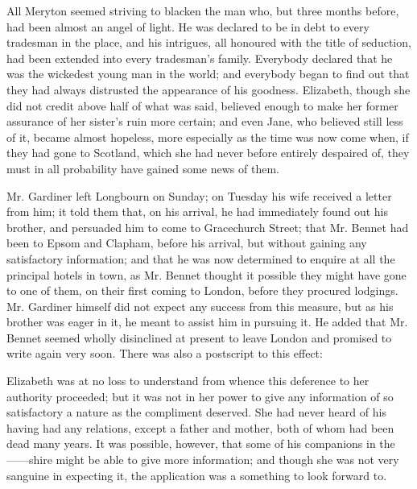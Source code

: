 All Meryton seemed striving to blacken the man who, but three months before, had been almost an angel of light. He was declared to be in debt to every tradesman in the place, and his intrigues, all honoured with the title of seduction, had been extended into every tradesman's family. Everybody declared that he was the wickedest young man in the world; and everybody began to find out that they had always distrusted the appearance of his goodness. Elizabeth, though she did not credit above half of what was said, believed enough to make her former assurance of her sister's ruin more certain; and even Jane, who believed still less of it, became almost hopeless, more especially as the time was now come when, if they had gone to Scotland, which she had never before entirely despaired of, they must in all probability have gained some news of them.

Mr. Gardiner left Longbourn on Sunday; on Tuesday his wife received a letter from him; it told them that, on his arrival, he had immediately found out his brother, and persuaded him to come to Gracechurch Street; that Mr. Bennet had been to Epsom and Clapham, before his arrival, but without gaining any satisfactory information; and that he was now determined to enquire at all the principal hotels in town, as Mr. Bennet thought it possible they might have gone to one of them, on their first coming to London, before they procured lodgings. Mr. Gardiner himself did not expect any success from this measure, but as his brother was eager in it, he meant to assist him in pursuing it. He added that Mr. Bennet seemed wholly disinclined at present to leave London and promised to write again very soon. There was also a postscript to this effect:


Elizabeth was at no loss to understand from whence this deference to her authority proceeded; but it was not in her power to give any information of so satisfactory a nature as the compliment deserved. She had never heard of his having had any relations, except a father and mother, both of whom had been dead many years. It was possible, however, that some of his companions in the ------shire might be able to give more information; and though she was not very sanguine in expecting it, the application was a something to look forward to.

